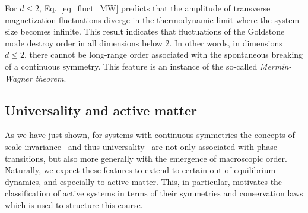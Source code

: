 %

For $d \le 2$, Eq.~\eqref{eq_fluct_MW} predicts that the amplitude of transverse magnetization fluctuations diverge in the thermodynamic limit where the system size becomes infinite.
This result indicates that fluctuations of the Goldstone mode destroy order in all dimensions below 2. 
In other words, in dimensions $d \leq 2$, there cannot be long-range order associated with the spontaneous breaking of a continuous symmetry.
This feature is an instance of the so-called \emph{Mermin-Wagner theorem}.

\subsection*{Universality and active matter}

As we have just shown, for systems with continuous symmetries the concepts of scale invariance --and thus universality-- are not only associated with phase transitions, but also more generally with the emergence of macroscopic order.
Naturally, we expect these features to extend to certain out-of-equilibrium dynamics, and especially to active matter.
This, in particular, motivates the classification of active systems in terms of their symmetries and conservation laws which is used to structure this course.


